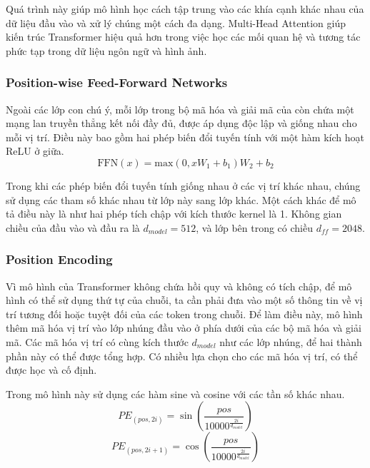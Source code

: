Quá trình này giúp mô hình học cách tập trung vào các khía cạnh khác nhau của dữ liệu đầu vào và xử lý chúng một cách đa dạng. Multi-Head Attention giúp kiến trúc Transformer hiệu quả hơn trong việc học các mối quan hệ và tương tác phức tạp trong dữ liệu ngôn ngữ và hình ảnh.

\subsubsection*{Position-wise Feed-Forward Networks}
Ngoài các lớp con chú ý, mỗi lớp trong bộ mã hóa và giải mã của còn chứa một mạng lan truyền thẳng kết nối đầy đủ, được áp dụng độc lập và giống nhau cho mỗi vị trí. Điều này bao gồm hai phép biến đổi tuyến tính với một hàm kích hoạt ReLU ở giữa.
\[
    \text{FFN}(x) = \text{max}(0, xW_1 + b_1)W_2 + b_2    
\]

Trong khi các phép biến đổi tuyến tính giống nhau ở các vị trí khác nhau, chúng sử dụng các tham số khác nhau từ lớp này sang lớp khác. Một cách khác để mô tả điều này là như hai phép tích chập với kích thước kernel là 1. Không gian chiều của đầu vào và đầu ra là $d_{model} = 512$, và lớp bên trong có chiều $d_{ff} = 2048$.

\subsubsection*{Position Encoding}
Vì mô hình của Transformer không chứa hồi quy và không có tích chập, để mô hình có thể sử dụng thứ tự của chuỗi, ta cần phải đưa vào một số thông tin về vị trí tương đối hoặc tuyệt đối của các token trong chuỗi. Để làm điều này, mô hình thêm mã hóa vị trí vào lớp nhúng đầu vào ở phía dưới của các bộ mã hóa và giải mã. Các mã hóa vị trí có cùng kích thước $d_{model}$ như các lớp nhúng, để hai thành phần này có thể được tổng hợp. Có nhiều lựa chọn cho các mã hóa vị trí, có thể được học và cố định.

Trong mô hình này sử dụng các hàm sine và cosine với các tần số khác nhau.
\[
    PE_{(pos, 2i)} = \sin(\frac{pos}{10000^{\frac{2i}{d_{model}}}})    
\]
\[
    PE_{(pos, 2i+1)} = \cos(\frac{pos}{10000^{\frac{2i}{d_{model}}}})    
\]

